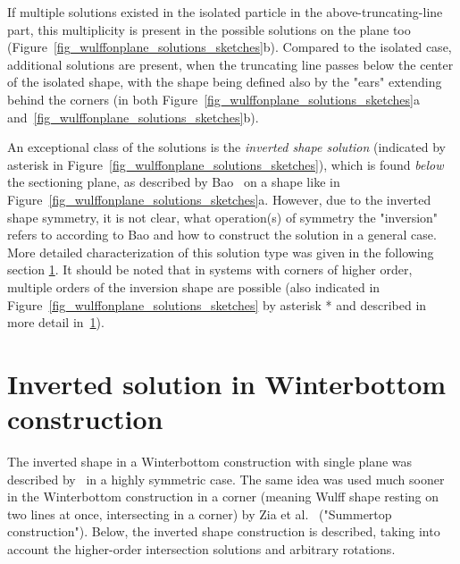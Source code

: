 If multiple solutions existed in the isolated particle in the above-truncating-line part, this multiplicity is present in the possible solutions on the plane too (Figure~\ref{fig_wulffonplane_solutions_sketches}b). Compared to the isolated case, additional solutions are present, when the truncating line passes below the center of the isolated shape, with the shape being defined also by the "ears" extending behind the corners (in both Figure~\ref{fig_wulffonplane_solutions_sketches}a and~\ref{fig_wulffonplane_solutions_sketches}b).

An exceptional class of the solutions is the \textit{inverted shape solution} (indicated by asterisk in Figure~\ref{fig_wulffonplane_solutions_sketches}), which is found \textit{below} the sectioning plane, as described by Bao~\cite{Bao2017} on a shape like in Figure~\ref{fig_wulffonplane_solutions_sketches}a. However, due to the inverted shape symmetry, it is not clear, what operation(s) of symmetry the "inversion" refers to according to Bao and how to construct the solution in a general case. More detailed characterization of this solution type was given in the following section \ref{sec_inverted_Winterbottom}. It should be noted that in systems with corners of higher order, multiple orders of the inversion shape are possible (also indicated in Figure~\ref{fig_wulffonplane_solutions_sketches} by asterisk * and described in more detail in~\ref{sec_inverted_Winterbottom}).

\section{Inverted solution in Winterbottom construction} \label{sec_inverted_Winterbottom}
The inverted shape in a Winterbottom construction with single plane was described by~\cite{Bao2017} in a highly symmetric case. The same idea was used much sooner in the Winterbottom construction in a corner (meaning Wulff shape resting on two lines at once, intersecting in a corner) by Zia et al.~\cite{Zia1988} ("Summertop construction"). Below, the inverted shape construction is described, taking into account the higher-order intersection solutions and arbitrary rotations.

